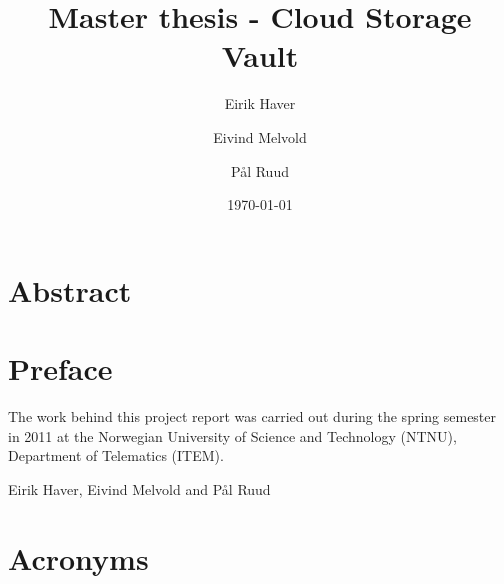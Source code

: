 \documentclass[pdftex,english,10pt,b5paper,twoside]{book}
\author{Eirik Haver \and Eivind Melvold \and Pål Ruud}
\title{Master thesis - Cloud Storage Vault}
\date{\today}
\begin{document}

\pagestyle{empty}

\chapter*{Abstract}
\pagestyle{plain}
\setcounter{page}{1}

%

\chapter*{Preface}

The work behind this project report was carried out during the spring semester
in 2011 at the Norwegian University of Science and Technology (NTNU), Department
of Telematics (ITEM).
\vspace{13pt}

\begin{center}
Eirik Haver, Eivind Melvold and Pål Ruud
\vspace{13pt}

\end{center}

\tableofcontents

\cleardoublepage
{}
{}
\listoffigures

\cleardoublepage
{}
{}
\listoftables

\cleardoublepage
{}
{}
\lstlistoflistings
\cleardoublepage

\chapter*{Acronyms}
\end{document}

